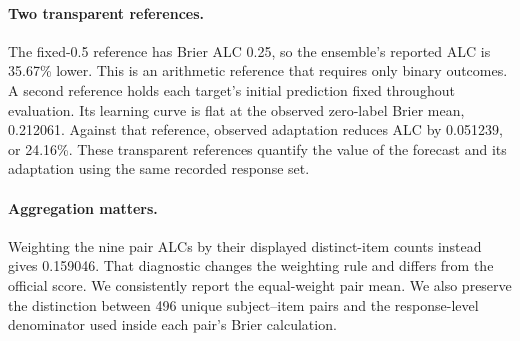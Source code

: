 \paragraph{Two transparent references.}
The fixed-0.5 reference has Brier ALC 0.25, so the ensemble's reported ALC is 35.67\% lower. This is an arithmetic reference that requires only binary outcomes. A second reference holds each target's initial prediction fixed throughout evaluation. Its learning curve is flat at the observed zero-label Brier mean, 0.212061. Against that reference, observed adaptation reduces ALC by 0.051239, or 24.16\%. These transparent references quantify the value of the forecast and its adaptation using the same recorded response set.

\paragraph{Aggregation matters.}
Weighting the nine pair ALCs by their displayed distinct-item counts instead gives 0.159046. That diagnostic changes the weighting rule and differs from the official score. We consistently report the equal-weight pair mean. We also preserve the distinction between 496 unique subject--item pairs and the response-level denominator used inside each pair's Brier calculation.
